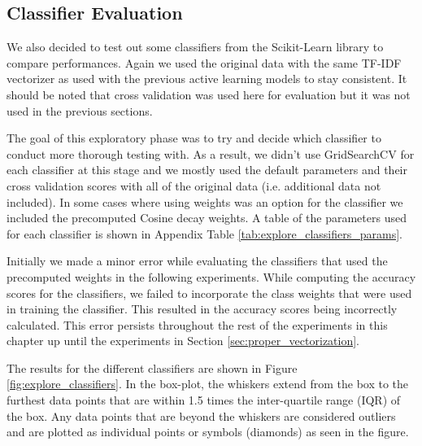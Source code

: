 \subsection{Classifier Evaluation}

We also decided to test out some classifiers from the Scikit-Learn library to compare performances. Again we used the original data with the same TF-IDF vectorizer as used with the previous active learning models to stay consistent. It should be noted that cross validation was used here for evaluation but it was not used in the previous sections.

The goal of this exploratory phase was to try and decide which classifier to conduct more thorough testing with. As a result, we didn't use GridSearchCV for each classifier at this stage and we mostly used the default parameters and their cross validation scores with all of the original data (i.e. additional data not included). In some cases where using weights was an option for the classifier we included the precomputed Cosine decay weights. A table of the parameters used for each classifier is shown in Appendix Table \ref{tab:explore_classifiers_params}.

Initially we made a minor error while evaluating the classifiers that used the precomputed weights in the following experiments. While computing the accuracy scores for the classifiers, we failed to incorporate the class weights that were used in training the classifier. This resulted in the accuracy scores being incorrectly calculated. This error persists throughout the rest of the experiments in this chapter up until the experiments in Section \ref{sec:proper_vectorization}.

The results for the different classifiers are shown in Figure \ref{fig:explore_classifiers}. In the box-plot, the whiskers extend from the box to the furthest data points that are within 1.5 times the inter-quartile range (IQR) of the box. Any data points that are beyond the whiskers are considered outliers and are plotted as individual points or symbols (diamonds) as seen in the figure.

